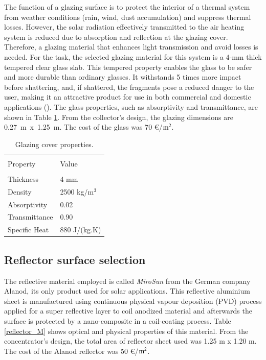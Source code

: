 The function of a glazing surface is to protect the interior of a thermal system from weather conditions (rain, wind, dust accumulation) and suppress thermal losses. However, the solar radiation effectively transmitted to the air heating system is reduced due to absorption and reflection at the glazing cover. Therefore, a glazing material that enhances light transmission and avoid losses is needed. For the task, the selected glazing material for this system is a 4-mm thick tempered clear glass slab. This tempered property enables the glass to be safer and more durable than ordinary glasses. It withstands 5 times more impact before shattering, and, if shattered, the fragments pose a reduced danger to the user, making it an attractive product for use in both commercial and domestic applications (\cite{FirstGlass2016}). The glass properties, such as absorptivity and transmittance, are shown in Table \ref{glass_tempered}. From the collector's design, the glazing dimensions are \mbox{0.27 m x 1.25 m}. The cost of the glass was 70 \euro/${\rm m^2}$.

\begin{table}[!ht]
	\caption{Glazing cover properties.}
	\centering
	\begin{tabular}{p{5cm}p{4cm}}
		\hline \\[-12pt] 
		Property & Value \\ 
		\hline \\[-12pt] 
		Thickness & 4 mm \\ [3pt]
		Density & 2500 kg/m$^3$ \\ [3pt]
		Absorptivity\footnotemark[1] & 0.02 \\ [3pt]
		Transmittance\footnotemark[1] & 0.90 \\ [3pt]
		Specific Heat & 880 J/(kg.K)  \\ [1pt]
		\hline 
	\end{tabular} 
	\label{glass_tempered}
\end{table}


\subsection{Reflector surface selection}

The reflective material employed is called \textit{MiroSun} from the German company Alanod, its only product used for solar applications. This reflective aluminium sheet is manufactured using continuous physical vapour deposition (PVD) process applied for a super reflective layer to coil anodized material and afterwards the surface is protected by a nano-composite in a coil-coating process. Table \ref{reflector_M} shows optical and physical properties of this material. From the concentrator's design, the total area of reflector sheet used was 1.25 m x 1.20 m. The cost of the Alanod reflector was 50 \euro/${\rm m^2}$.

